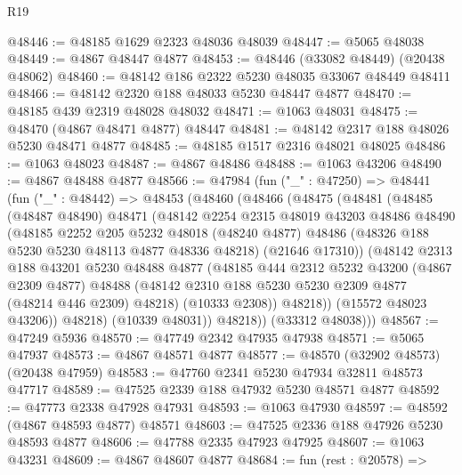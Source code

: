 \begin{lexlean}{R19}
\begin{coremodule}
@48446 := @48185 @1629 @2323 @48036 @48039
@48447 := @5065 @48038
@48449 := @4867 @48447 @4877
@48453 := @48446 (@33082 @48449) (@20438 @48062)
@48460 := @48142 @186 @2322 @5230 @48035 @33067 @48449 @48411
@48466 := @48142 @2320 @188 @48033 @5230 @48447 @4877
@48470 := @48185 @439 @2319 @48028 @48032
@48471 := @1063 @48031
@48475 := @48470 (@4867 @48471 @4877) @48447
@48481 := @48142 @2317 @188 @48026 @5230 @48471 @4877
@48485 := @48185 @1517 @2316 @48021 @48025
@48486 := @1063 @48023
@48487 := @4867 @48486
@48488 := @1063 @43206
@48490 := @4867 @48488 @4877
@48566 := @47984
    (fun ("_" : @47250) =>
    @48441
      (fun ("_" : @48442) =>
      @48453
        (@48460
          (@48466
            (@48475
              (@48481
                (@48485
                  (@48487 @48490)
                  @48471
                  (@48142
                    @2254
                    @2315
                    @48019
                    @43203
                    @48486
                    @48490
                    (@48185
                      @2252
                      @205
                      @5232
                      @48018
                      (@48240 @4877)
                      @48486
                      (@48326 @188 @5230 @5230 @48113 @4877 @48336 @48218)
                      (@21646 @17310))
                    (@48142
                      @2313
                      @188
                      @43201
                      @5230
                      @48488
                      @4877
                      (@48185
                        @444
                        @2312
                        @5232
                        @43200
                        (@4867 @2309 @4877)
                        @48488
                        (@48142 @2310 @188 @5230 @5230 @2309 @4877 (@48214 @446 @2309) @48218)
                        (@10333 @2308))
                      @48218))
                  (@15572 @48023 @43206))
                @48218)
              (@10339 @48031))
            @48218))
        (@33312 @48038)))
@48567 := @47249 @5936
@48570 := @47749 @2342 @47935 @47938
@48571 := @5065 @47937
@48573 := @4867 @48571 @4877
@48577 := @48570 (@32902 @48573) (@20438 @47959)
@48583 := @47760 @2341 @5230 @47934 @32811 @48573 @47717
@48589 := @47525 @2339 @188 @47932 @5230 @48571 @4877
@48592 := @47773 @2338 @47928 @47931
@48593 := @1063 @47930
@48597 := @48592 (@4867 @48593 @4877) @48571
@48603 := @47525 @2336 @188 @47926 @5230 @48593 @4877
@48606 := @47788 @2335 @47923 @47925
@48607 := @1063 @43231
@48609 := @4867 @48607 @4877
@48684 := fun (rest : @20578) =>

\end{coremodule}
\end{lexlean}

